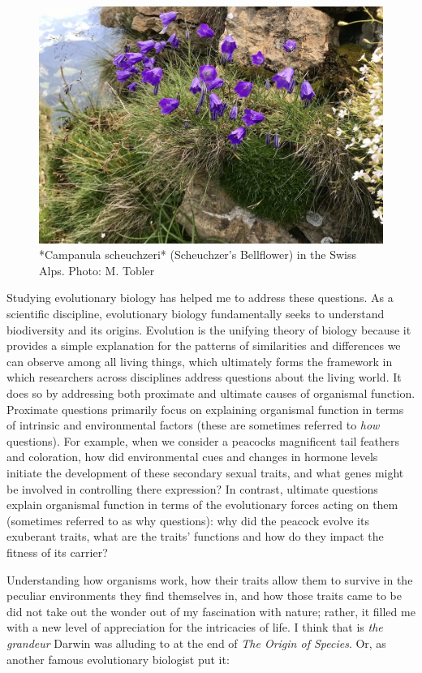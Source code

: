 \documentclass[
]{book}
\begin{document}
\begin{figure}
\includegraphics[width=1\linewidth]{images/campanula} \caption{*Campanula scheuchzeri* (Scheuchzer's Bellflower) in the Swiss Alps. Photo: M. Tobler}\label{fig:campanula}
\end{figure}

Studying evolutionary biology has helped me to address these questions. As a scientific discipline, evolutionary biology fundamentally seeks to understand biodiversity and its origins. Evolution is the unifying theory of biology because it provides a simple explanation for the patterns of similarities and differences we can observe among all living things, which ultimately forms the framework in which researchers across disciplines address questions about the living world. It does so by addressing both proximate and ultimate causes of organismal function. Proximate questions primarily focus on explaining organismal function in terms of intrinsic and environmental factors (these are sometimes referred to \emph{how} questions). For example, when we consider a peacocks magnificent tail feathers and coloration, how did environmental cues and changes in hormone levels initiate the development of these secondary sexual traits, and what genes might be involved in controlling there expression? In contrast, ultimate questions explain organismal function in terms of the evolutionary forces acting on them (sometimes referred to as why questions): why did the peacock evolve its exuberant traits, what are the traits' functions and how do they impact the fitness of its carrier?

Understanding how organisms work, how their traits allow them to survive in the peculiar environments they find themselves in, and how those traits came to be did not take out the wonder out of my fascination with nature; rather, it filled me with a new level of appreciation for the intricacies of life. I think that is \emph{the grandeur} Darwin was alluding to at the end of \emph{The Origin of Species}. Or, as another famous evolutionary biologist put it:
\end{document}
